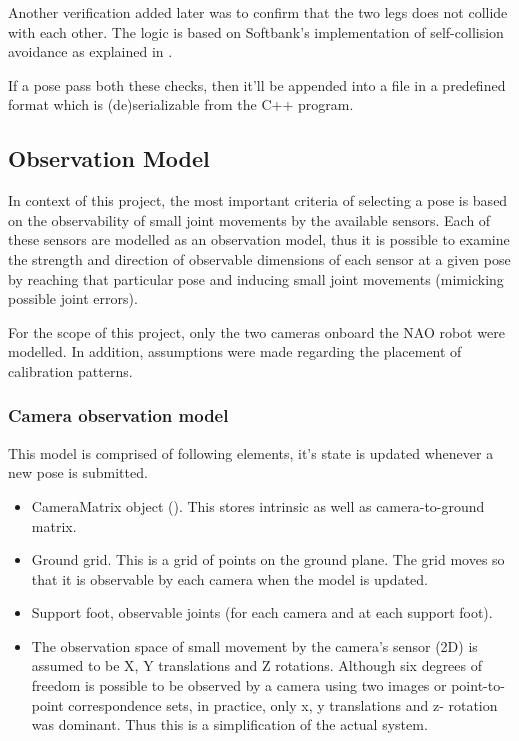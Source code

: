\documentclass[english, printversion, nomenclature, notitle]{tuvisionthesis} %
\begin{document}
Another verification added later was to confirm that the two legs does not collide with each other. The logic is based on Softbank's implementation of self-collision avoidance as explained in .

If a pose pass both these checks, then it'll be appended into a file in a predefined format which is (de)serializable from the C++ program. 

\subsection{Observation Model}
In context of this project, the most important criteria of selecting a pose is based on the observability of small joint movements by the available sensors. Each of these sensors are modelled as an observation model, thus it is possible to examine the strength and direction of observable dimensions of each sensor at a given pose by reaching that particular pose and inducing small joint movements (mimicking possible joint errors).

For the scope of this project, only the two cameras onboard the NAO robot were modelled. In addition, assumptions were made regarding the placement of calibration patterns.

\subsubsection{Camera observation model}

This model is comprised of following elements, it's state is updated whenever a new pose is submitted. 
\begin{itemize}
	\item CameraMatrix object ().
	\subitem This stores intrinsic as well as camera-to-ground matrix.
	\item Ground grid. This is a grid of points on the ground plane.
	\subitem The grid moves so that it is observable by each camera when the model is updated.
	\item Support foot, observable joints (for each camera and at each support foot). 
	\item The observation space of small movement by the camera's sensor (2D) is assumed to be X, Y translations and Z rotations.
	\subitem Although six degrees of freedom is possible to be observed by a camera using two images or point-to-point correspondence sets, in practice, only x, y translations and z- rotation was dominant.  Thus this is a simplification of the actual system.
\end{itemize}
\end{document}
